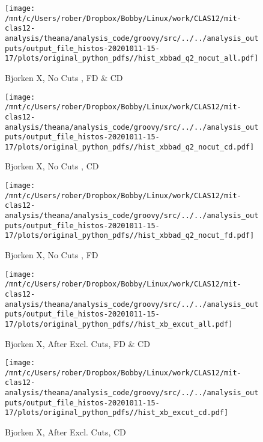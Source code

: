 \documentclass{article}
\begin{document}
\begin{landscape}
    \begin{figure}[h]
        \centering

        \texttt{[image: /mnt/c/Users/rober/Dropbox/Bobby/Linux/work/CLAS12/mit-clas12-analysis/theana/analysis\_code/groovy/src/../../analysis\_outputs/output\_file\_histos-20201011-15-17/plots/original\_python\_pdfs//hist\_xbbad\_q2\_nocut\_all.pdf]}
        \captionsetup{textformat=empty,labelformat=blank}
        \caption{Bjorken X, No Cuts , FD \& CD}
    \end{figure}
    \clearpage
    
    \begin{figure}[h]
        \centering

        \texttt{[image: /mnt/c/Users/rober/Dropbox/Bobby/Linux/work/CLAS12/mit-clas12-analysis/theana/analysis\_code/groovy/src/../../analysis\_outputs/output\_file\_histos-20201011-15-17/plots/original\_python\_pdfs//hist\_xbbad\_q2\_nocut\_cd.pdf]}
        \captionsetup{textformat=empty,labelformat=blank}
        \caption{Bjorken X, No Cuts , CD}
    \end{figure}
    \clearpage
    
    \begin{figure}[h]
        \centering

        \texttt{[image: /mnt/c/Users/rober/Dropbox/Bobby/Linux/work/CLAS12/mit-clas12-analysis/theana/analysis\_code/groovy/src/../../analysis\_outputs/output\_file\_histos-20201011-15-17/plots/original\_python\_pdfs//hist\_xbbad\_q2\_nocut\_fd.pdf]}
        \captionsetup{textformat=empty,labelformat=blank}
        \caption{Bjorken X, No Cuts , FD}
    \end{figure}
    \clearpage
    
    \begin{figure}[h]
        \centering

        \texttt{[image: /mnt/c/Users/rober/Dropbox/Bobby/Linux/work/CLAS12/mit-clas12-analysis/theana/analysis\_code/groovy/src/../../analysis\_outputs/output\_file\_histos-20201011-15-17/plots/original\_python\_pdfs//hist\_xb\_excut\_all.pdf]}
        \captionsetup{textformat=empty,labelformat=blank}
        \caption{Bjorken X, After Excl. Cuts, FD \& CD}
    \end{figure}
    \clearpage
    
    \begin{figure}[h]
        \centering

        \texttt{[image: /mnt/c/Users/rober/Dropbox/Bobby/Linux/work/CLAS12/mit-clas12-analysis/theana/analysis\_code/groovy/src/../../analysis\_outputs/output\_file\_histos-20201011-15-17/plots/original\_python\_pdfs//hist\_xb\_excut\_cd.pdf]}
        \captionsetup{textformat=empty,labelformat=blank}
        \caption{Bjorken X, After Excl. Cuts, CD}
    \end{figure}
    \clearpage
    

\end{landscape}
\end{document}
